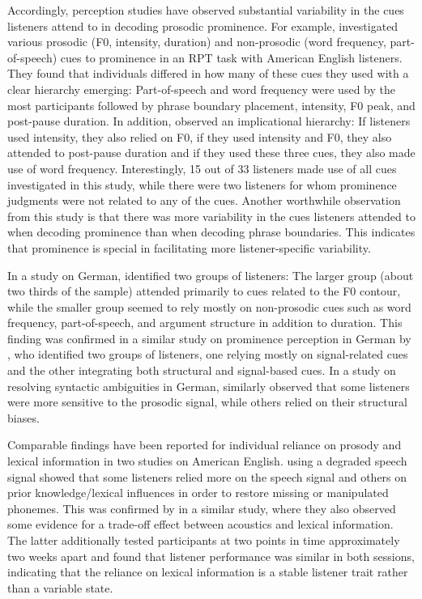 \newpage
Accordingly, perception studies have observed substantial variability in the cues listeners attend to in decoding prosodic prominence. For example, \citet{royIndividualDifferencesPatterns2017} investigated various prosodic (F0, intensity, duration) and non-prosodic (word frequency, part-of-speech) cues to prominence in an RPT task with American English listeners. They found that individuals differed in how many of these cues they used with a clear hierarchy emerging: Part-of-speech and word frequency were used by the most participants followed by phrase boundary placement, intensity, F0 peak, and post-pause duration. In addition, \citet{royIndividualDifferencesPatterns2017} observed an implicational hierarchy: If listeners used intensity, they also relied on F0, if they used intensity and F0, they also attended to post-pause duration and if they used these three cues, they also made use of word frequency. Interestingly, 15 out of 33 listeners made use of all cues investigated in this study, while there were two listeners for whom prominence judgments were not related to any of the cues. Another worthwhile observation from this study is that there was more variability in the cues listeners attended to when decoding prominence than when decoding phrase boundaries. This indicates that prominence is special in facilitating more listener-specific variability.

In a study on German, \citet{baumannWhatMakesWord2018} identified two groups of listeners: The larger group (about two thirds of the sample) attended primarily to cues related to the F0 contour, while the smaller group seemed to rely mostly on non-prosodic cues such as word frequency, part-of-speech, and argument structure in addition to duration. This finding was confirmed in a similar study on prominence perception in German by \citet{wagnerExploitingSpeechgestureLink2019}, who identified two groups of listeners, one relying mostly on signal-related cues and the other integrating both structural and signal-based cues. In a study on resolving syntactic ambiguities in German, \citet{vanderburghtPitchAccentsCreate2021} similarly observed that some listeners were more sensitive to the prosodic signal, while others relied on their structural biases.

Comparable findings have been reported for individual reliance on prosody and lexical information in two studies on American English. \citet{ishidaPeopleAreMore2016} using a degraded speech signal showed that some listeners relied more on the speech signal and others on prior knowledge/lexical influences in order to restore missing or manipulated phonemes. This was confirmed by \citet{giovannoneIndividualDifferencesLexical2023} in a similar study, where they also observed some evidence for a trade-off effect between acoustics and lexical information. The latter additionally tested participants at two points in time approximately two weeks apart and found that listener performance was similar in both sessions, indicating that the reliance on lexical information is a stable listener trait rather than a variable state.

